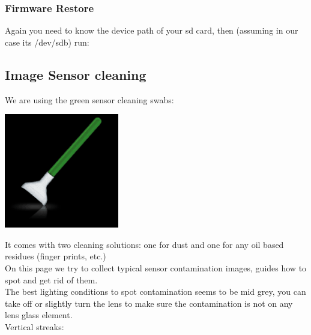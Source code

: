 \subsubsection{Firmware Restore}

Again you need to know the device path of your sd card, then (assuming in our case its /dev/sdb) run:







\subsection{Image Sensor cleaning}

We are using the green sensor cleaning swabs:

\begin{center}
\includegraphics[height=5cm]{images/Green_Swabs_200X200_B}
\end{center}

It comes with two cleaning solutions: one for dust and one for any oil based residues (finger prints, etc.)\\

On this page we try to collect typical sensor contamination images, guides how to spot and get rid of them.\\

The best lighting conditions to spot contamination seems to be mid grey, you can take off or slightly turn the lens to make sure the contamination is not on any lens glass element.\\

Vertical streaks:\\


